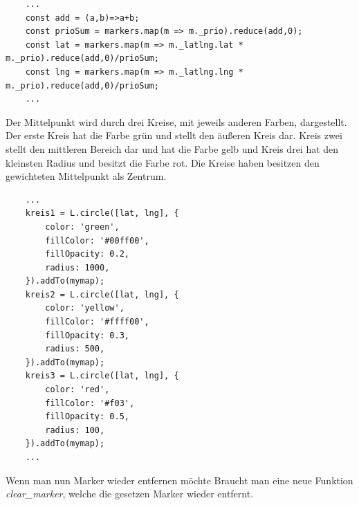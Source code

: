 \documentclass[a4paper, 12pt]{scrreprt}
\begin{document}
\begin{lstlisting}
	...
	const add = (a,b)=>a+b;
	const prioSum = markers.map(m => m._prio).reduce(add,0);
	const lat = markers.map(m => m._latlng.lat * m._prio).reduce(add,0)/prioSum;
	const lng = markers.map(m => m._latlng.lng * m._prio).reduce(add,0)/prioSum;
	...
\end{lstlisting}
Der Mittelpunkt wird durch drei Kreise, mit jeweils anderen Farben, dargestellt.
Der erste Kreis hat die Farbe grün und stellt den äußeren Kreis dar.
Kreis zwei stellt den mittleren Bereich dar und hat die Farbe gelb und Kreis drei hat den kleinsten Radius und besitzt die Farbe rot.
Die Kreise haben besitzen den gewichteten Mittelpunkt als Zentrum.
\begin{lstlisting}
	...
	kreis1 = L.circle([lat, lng], {
		color: 'green',
		fillColor: '#00ff00',
		fillOpacity: 0.2,
		radius: 1000,
	}).addTo(mymap);
	kreis2 = L.circle([lat, lng], {
		color: 'yellow',
		fillColor: '#ffff00',
		fillOpacity: 0.3,
		radius: 500,
	}).addTo(mymap);
	kreis3 = L.circle([lat, lng], {
		color: 'red',
		fillColor: '#f03',
		fillOpacity: 0.5,
		radius: 100,
	}).addTo(mymap);
	...
\end{lstlisting}
Wenn man nun Marker wieder entfernen möchte Braucht man eine neue Funktion \textit{clear\_marker}, welche die gesetzen Marker wieder entfernt.
\end{document}
